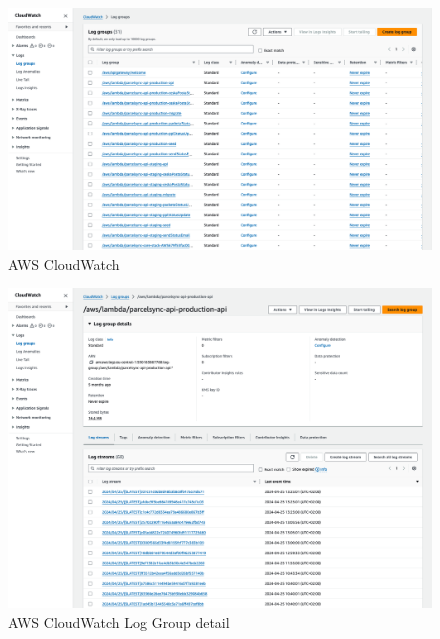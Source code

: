 \begin{figure}[H]\centering
\includegraphics[width=140mm]{img/docs/fig_aws_cloudwatch.png}
\caption{AWS CloudWatch}
\label{img:admin-manual-aws.lambda.log}
\end{figure}

\begin{figure}[H]\centering
\includegraphics[width=140mm]{img/docs/fig_aws_loggroup.png}
\caption{AWS CloudWatch Log Group detail}
\label{img:admin-manual-aws.lambda.log.detail}
\end{figure}

